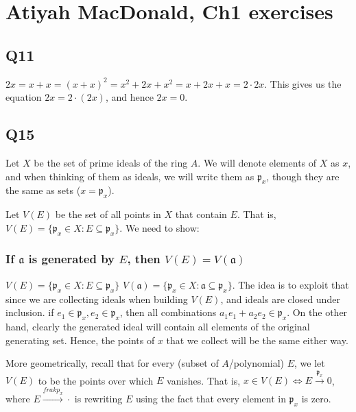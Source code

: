 \documentclass{book}
\newcommand{\frakp}{\ensuremath{\mathfrak{p}}}
\newcommand{\fraka}{\ensuremath{\mathfrak{a}}}
\theoremstyle{definition}
\begin{document}

\chapter{Atiyah MacDonald, Ch1 exercises}

\section{Q11}
$2x = x + x = (x+x)^2 = x^2 + 2x + x^2 = x + 2x + x = 2 \cdot 2x$. This gives
us the equation $2x = 2 \cdot (2x)$, and hence $2x = 0$.

\section{Q15}

Let $X$ be the set of prime ideals of the ring $A$. 
We will denote elements of $X$ as $x$, and when thinking of them as ideals,
we will write them as $\frakp_x$, though they are the same as sets ($x = \frakp_x$).    

Let $V(E)$ be the set of all points in $X$ that contain $E$. That is,
$V(E) = \{ \frakp_x \in X : E \subseteq \frakp_x \}$. We need to show:

\subsection{If $\fraka$ is generated by $E$, then $V(E) = V(\fraka)$}

$V(E) = \{ \frakp_x \in X : E \subseteq \frakp_x \}$
$V(\fraka) = \{ \frakp_x \in X : \fraka \subseteq \frakp_x \}$. The idea
is to exploit that since we are collecting ideals when building $V(E)$, and ideals
are closed under inclusion. if $e_1 \in \frakp_x, e_2 \in \frakp_x$, then
all combinations $a_1 e_1 + a_2 e_2 \in \frakp_x$. On the other hand, clearly 
the generated ideal will contain all elements of the original generating set.
Hence, the points of $x$ that we collect will be the same either way.


More geometrically, recall that for every (subset of $A$/polynomial) $E$, we let
$V(E)$ to be the points over which $E$ vanishes. That is, $x \in V(E) \iff E \xrightarrow{\frakp_x} 0$, 
where $E \xrightarrow{frakp_x} \cdot$ is rewriting $E$ using the fact that every element in
$\frakp_x$ is zero.
\end{document}
